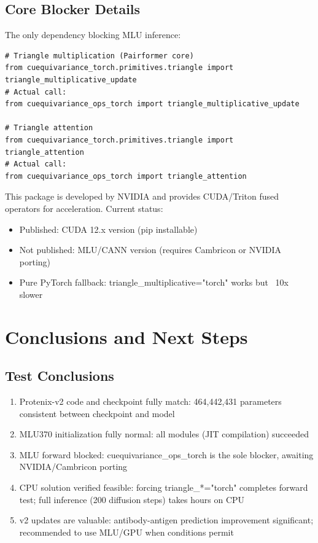 \documentclass[12pt,a4paper]{article}
\begin{document}
\subsection{Core Blocker Details}

The only dependency blocking MLU inference:

\begin{verbatim}
# Triangle multiplication (Pairformer core)
from cuequivariance_torch.primitives.triangle import triangle_multiplicative_update
# Actual call:
from cuequivariance_ops_torch import triangle_multiplicative_update

# Triangle attention
from cuequivariance_torch.primitives.triangle import triangle_attention
# Actual call:
from cuequivariance_ops_torch import triangle_attention
\end{verbatim}

This package is developed by NVIDIA and provides CUDA/Triton fused operators for acceleration. Current status:
\begin{itemize}
    \item Published: CUDA 12.x version (pip installable)
    \item Not published: MLU/CANN version (requires Cambricon or NVIDIA porting)
    \item Pure PyTorch fallback: triangle_multiplicative="torch" works but ~10x slower
\end{itemize}

\clearpage

\section{Conclusions and Next Steps}

\subsection{Test Conclusions}

\begin{enumerate}
    \item Protenix-v2 code and checkpoint fully match: 464,442,431 parameters consistent between checkpoint and model
    \item MLU370 initialization fully normal: all modules (JIT compilation) succeeded
    \item MLU forward blocked: cuequivariance_ops_torch is the sole blocker, awaiting NVIDIA/Cambricon porting
    \item CPU solution verified feasible: forcing triangle_*="torch" completes forward test; full inference (200 diffusion steps) takes hours on CPU
    \item v2 updates are valuable: antibody-antigen prediction improvement significant; recommended to use MLU/GPU when conditions permit
\end{enumerate}
\end{document}
